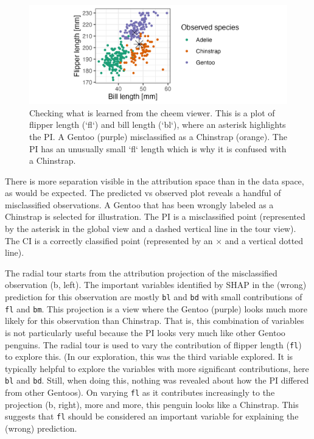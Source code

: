 \documentclass[
]{jss}
\begin{document}
\begin{CodeChunk}
\begin{figure}

{\centering \includegraphics[width=1\linewidth]{./figures/case_penguins_BlFl} 

}

\caption[Checking what is learned from the cheem viewer]{Checking what is learned from the cheem viewer. This is a plot of flipper length (`fl`) and bill length (`bl`), where an asterisk highlights the PI. A Gentoo (purple) misclassified as a Chinstrap (orange). The PI has an unusually small `fl` length which is why it is confused with a Chinstrap.}\label{fig:casepenguinsblfl}
\end{figure}
\end{CodeChunk}

There is more separation visible in the attribution space than in the
data space, as would be expected. The predicted vs observed plot reveals
a handful of misclassified observations. A Gentoo that has been wrongly
labeled as a Chinstrap is selected for illustration. The PI is a
misclassified point (represented by the asterisk in the global view and
a dashed vertical line in the tour view). The CI is a correctly
classified point (represented by an \(\times\) and a vertical dotted
line).

The radial tour starts from the attribution projection of the
misclassified observation (b, left). The important variables identified
by SHAP in the (wrong) prediction for this observation are mostly
\texttt{bl} and \texttt{bd} with small contributions of \texttt{fl} and
\texttt{bm}. This projection is a view where the Gentoo (purple) looks
much more likely for this observation than Chinstrap. That is, this
combination of variables is not particularly useful because the PI looks
very much like other Gentoo penguins. The radial tour is used to vary
the contribution of flipper length (\texttt{fl}) to explore this. (In
our exploration, this was the third variable explored. It is typically
helpful to explore the variables with more significant contributions,
here \texttt{bl} and \texttt{bd}. Still, when doing this, nothing was
revealed about how the PI differed from other Gentoos). On varying
\texttt{fl} as it contributes increasingly to the projection (b, right),
more and more, this penguin looks like a Chinstrap. This suggests that
\texttt{fl} should be considered an important variable for explaining
the (wrong) prediction.
\end{document}
